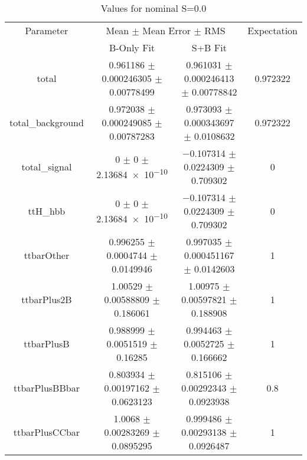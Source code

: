 \begin{table}
\centering
\caption{Values for nominal S=0.0}
\begin{tabular}{cccc}
\toprule
Parameter & \multicolumn{2}{c}{Mean $\pm$ Mean Error $\pm$ RMS} & Expectation\\
 & B-Only Fit & S+B Fit & \\
\midrule
total & \num{0.961186} $\pm$ \num{0.000246305} $\pm$ \num{0.00778499} & \num{0.961031} $\pm$ \num{0.000246413} $\pm$ \num{0.00778842} & \num{0.972322}\\
total\_background & \num{0.972038} $\pm$ \num{0.000249085} $\pm$ \num{0.00787283} & \num{0.973093} $\pm$ \num{0.000343697} $\pm$ \num{0.0108632} & \num{0.972322}\\
total\_signal & \num{0} $\pm$ \num{0} $\pm$ \num{2.13684e-10} & \num{-0.107314} $\pm$ \num{0.0224309} $\pm$ \num{0.709302} & \num{0}\\
ttH\_hbb & \num{0} $\pm$ \num{0} $\pm$ \num{2.13684e-10} & \num{-0.107314} $\pm$ \num{0.0224309} $\pm$ \num{0.709302} & \num{0}\\
ttbarOther & \num{0.996255} $\pm$ \num{0.0004744} $\pm$ \num{0.0149946} & \num{0.997035} $\pm$ \num{0.000451167} $\pm$ \num{0.0142603} & \num{1}\\
ttbarPlus2B & \num{1.00529} $\pm$ \num{0.00588809} $\pm$ \num{0.186061} & \num{1.00975} $\pm$ \num{0.00597821} $\pm$ \num{0.188908} & \num{1}\\
ttbarPlusB & \num{0.988999} $\pm$ \num{0.0051519} $\pm$ \num{0.16285} & \num{0.994463} $\pm$ \num{0.0052725} $\pm$ \num{0.166662} & \num{1}\\
ttbarPlusBBbar & \num{0.803934} $\pm$ \num{0.00197162} $\pm$ \num{0.0623123} & \num{0.815106} $\pm$ \num{0.00292343} $\pm$ \num{0.0923938} & \num{0.8}\\
ttbarPlusCCbar & \num{1.0068} $\pm$ \num{0.00283269} $\pm$ \num{0.0895295} & \num{0.999486} $\pm$ \num{0.00293138} $\pm$ \num{0.0926487} & \num{1}\\
\bottomrule
\end{tabular}
\end{table}